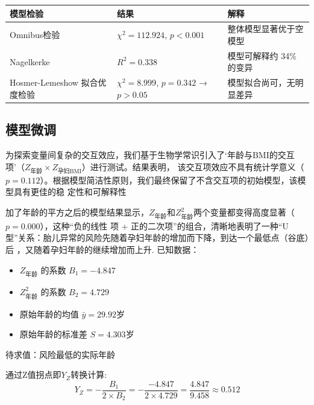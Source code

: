 \documentclass[withoutpreface,notoc]{cumcmthesis}
\begin{document}
	

	\begin{table}[!ht]
		\centering
		\begin{tabular}{|l|l|l|}
		\hline
			模型检验 & 结果 & 解释 \\ \hline
			Omnibus检验 & $\chi^2 = 112.924$, $p < 0.001$ & 整体模型显著优于空模型 \\ \hline
			Nagelkerke & $R^2 = 0.338$ & 模型可解释约 34\% 的变异 \\ \hline
			Hosmer-Lemeshow 拟合优度检验 & $\chi^2 = 8.999$, $p = 0.342$ → $p > 0.05$ & 模型拟合尚可，无明显差异\\ \hline
		\end{tabular}
	\end{table}





	
	





	\subsection{模型微调}

	为探索变量间复杂的交互效应，我们基于生物学常识引入了‘年龄与BMI的交互项’（$Z_{\text{年龄}} \times Z_{\text{孕妇BMI}}$）进行测试。结果表明，
	该交互项效应不具有统计学意义（$p=0.112$）。根据模型简洁性原则，我们最终保留了不含交互项的初始模型，该模型具有更佳的稳
	定性和可解释性

	加了年龄的平方之后的模型结果显示，$Z_{\text{年龄}}$和$Z^{2}_{\text{年龄}}$两个变量都变得高度显著（$p=0.000$），这种“负的线性
	项 + 正的二次项”的组合，清晰地表明了一种“U型”关系：胎儿异常的风险先随着孕妇年龄的增加而下降，到达一个最低点（谷底）后
	，又随着孕妇年龄的继续增加而上升.
	已知数据：
	\begin{itemize}
		\item 	$Z_{\text{年龄}} $ 的系数  $B_{1} = -4.847$
		\item 	$Z^{2}_{\text{年龄}}$ 的系数 $B_{2} = 4.729$
		\item 	原始年龄的均值 $\bar{y} = 29.92 $岁
		\item 	原始年龄的标准差 $S = 4.303 $岁
	\end{itemize}

	待求值：风险最低的实际年龄

	通过Z值拐点即$Y_{Z}$转换计算:
	\begin{equation}
	Y_{Z} = -\frac{B_1}{2 \times B_2} = -\frac{-4.847}{2 \times 4.729} = \frac{4.847}{9.458} \approx 0.512
	\end{equation}
\end{document}
